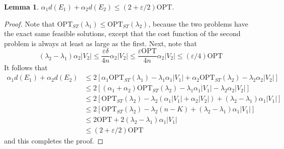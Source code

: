 \documentclass{article}
\theoremstyle{plain}
\newtheorem{lemma}{Lemma}
\begin{document}
\begin{lemma}
    $\alpha_1 d(E_1) + \alpha_2 d(E_2) \leq (2 + \varepsilon/2) \text{OPT}$.
\end{lemma}
\begin{proof}
    Note that $\text{OPT}_{ST}(\lambda_1) \leq \text{OPT}_{ST}(\lambda_2)$, because the two problems have the exact same feasible solutions, except that the cost function of the second problem is always at least as large as the first. Next, note that
    \[ (\lambda_2 - \lambda_1) \alpha_2 |V_2| \leq \frac{\varepsilon \delta}{4 n} \alpha_2 |V_2| \leq \frac{\varepsilon \text{OPT}}{4n} \alpha_2 |V_2| \leq (\varepsilon/4) \text{OPT} \]
    It follows that
    \begin{align*}
        \alpha_1 d(E_1) + \alpha_2 d(E_2) &\leq 2[\alpha_1 \text{OPT}_{ST}(\lambda_1) - \lambda_1 \alpha_1 |V_1| + \alpha_2 \text{OPT}_{ST}(\lambda_2) - \lambda_2 \alpha_2 |V_2|]\\
        &\leq 2[(\alpha_1 + \alpha_2) \text{OPT}_{ST}(\lambda_2) - \lambda_1 \alpha_1 |V_1| - \lambda_2 \alpha_2 |V_2|]\\
        &\leq 2[\text{OPT}_{ST}(\lambda_2) - \lambda_2(\alpha_1 |V_1| + \alpha_2 |V_2|) + (\lambda_2 - \lambda_1) \alpha_1 |V_1|]\\
        &\leq 2[ \text{OPT}_{ST}(\lambda_2) - \lambda_2(n-K) + (\lambda_2 - \lambda_1) \alpha_1 |V_1|]\\
        &\leq 2 \text{OPT} + 2 (\lambda_2 - \lambda_1) \alpha_1 |V_1|\\
        &\leq (2 + \varepsilon/2) \text{OPT}
    \end{align*}
    and this completes the proof.
\end{proof}
\end{document}
